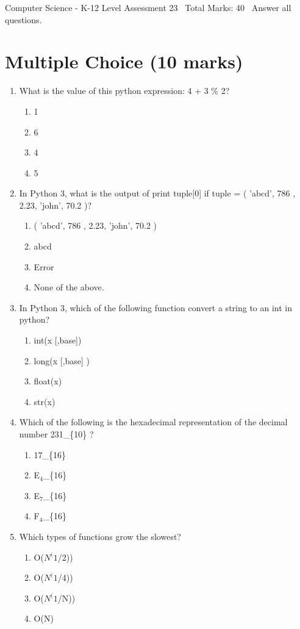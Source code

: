 \documentclass[12pt]{article}
\begin{document}
\begin{center}
Computer Science - K-12 Level Assessment 23 \
Total Marks: 40 \
Answer all questions.
\end{center}

\section*{Multiple Choice (10 marks)}
\begin{enumerate}[label=\arabic*.]
\item What is the value of this python expression: 4 + 3 \% 2?
\begin{enumerate}[label=(\alph*)]
    \item 1
    \item 6
    \item 4
    \item 5
\end{enumerate}
\item In Python 3, what is the output of print tuple[0] if tuple = ( 'abcd', 786 , 2.23, 'john', 70.2 )?
\begin{enumerate}[label=(\alph*)]
    \item ( 'abcd', 786 , 2.23, 'john', 70.2 )
    \item abcd
    \item Error
    \item None of the above.
\end{enumerate}
\item In Python 3, which of the following function convert a string to an int in python?
\begin{enumerate}[label=(\alph*)]
    \item int(x [,base])
    \item long(x [,base] )
    \item float(x)
    \item str(x)
\end{enumerate}
\item Which of the following is the hexadecimal representation of the decimal number 231\_\{10\} ?
\begin{enumerate}[label=(\alph*)]
    \item 17\_\{16\}
    \item E$_{4}$\_\{16\}
    \item E$_{7}$\_\{16\}
    \item F$_{4}$\_\{16\}
\end{enumerate}
\item Which types of functions grow the slowest?
\begin{enumerate}[label=(\alph*)]
    \item O($N^(1$/2))
    \item O($N^(1$/4))
    \item O($N^(1$/N))
    \item O(N)
\end{enumerate}
\end{enumerate}
\end{document}
